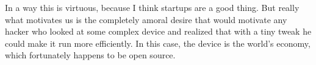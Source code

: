 In a way
                  this is virtuous, because I think startups are a good thing.
                  But really what motivates us is the completely amoral desire
                  that would motivate any hacker who looked at some complex
                  device and realized that with a tiny tweak he could make it
                  run more efficiently. In this case, the device is the world's
                  economy, which fortunately happens to be open source.


              
            
          
            
              
                


                  
              
            
          
